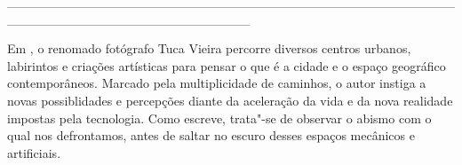 \hspace*{-2cm}\_\_\_\_\_\_\_\_\_\_\_\_\_\_\_\_\_\_\_\_\_\_\_\_\_\_\_\_\_\_\_\_\_\_\_\_\_\_\_\_\_\_\_\_\_\_\_\_\_\_\_\_\_\_\_\_\_\_\_\_\_\_\_\_\_\_\_\_\_\_\_\_\_\_

\medskip

\noindent{}Em {}, o renomado fotógrafo Tuca Vieira percorre diversos centros urbanos, labirintos e criações artísticas para pensar o que é a cidade e o espaço geográfico contemporâneos. Marcado pela multiplicidade de caminhos, o autor instiga a novas possiblidades e percepções diante da aceleração da vida e da nova realidade impostas pela tecnologia. Como escreve, trata"-se de observar o abismo com o qual nos defrontamos, antes de saltar no escuro desses espaços mecânicos e artificiais.

\vfill

\hspace*{-.4cm}\begin{minipage}[c]{0.45\linewidth}
\small{
{}}
\end{minipage}

\pagebreak